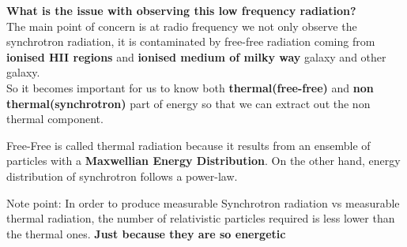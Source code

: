 \documentclass[11pt]{report}
\newcommand{\cbox}{tcolorbox}
\begin{document}
\textbf{What is the issue with observing this low frequency radiation?}\\
The main point of concern is at radio frequency we not only observe the synchrotron radiation, it is contaminated by free-free radiation coming from \textbf{ionised HII regions} and \textbf{ionised medium of milky way} galaxy and other galaxy.\\

So it becomes important for us to know both \textbf{thermal(free-free)} and \textbf{non thermal(synchrotron)} part of energy so that we can extract out the non thermal component.\\
\begin{\cbox}
Free-Free is called thermal radiation because it results from an ensemble of particles with a \textbf{Maxwellian Energy Distribution}. On the other hand, energy distribution of synchrotron follows a power-law.
\end{\cbox}
\begin{\cbox}
Note point: In order to produce measurable Synchrotron radiation vs measurable thermal radiation, the number of relativistic particles required is less lower than the thermal ones. \textbf{Just because they are so energetic} 
\end{\cbox}
\end{document}
